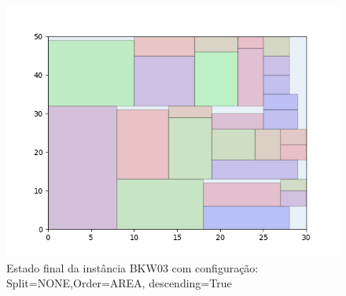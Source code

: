 \begin{figure}[H]
    \centering
    \caption[]{Estado final da instância BKW03 com configuração: Split=NONE,Order=AREA, descending=True}
    \label{fig:bkw03-none-area-true}
    \includegraphics[scale=0.5]{output/figures/bkw/bkw03/none/area/true/00}
\end{figure}